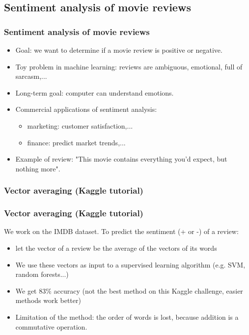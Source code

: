 \documentclass{beamer}
\begin{document}
\begin{frame}
\subsection{Sentiment analysis of movie reviews}

\frametitle{Sentiment analysis of movie reviews}

\begin{itemize}
\item Goal: we want to determine if a movie review is positive or negative. 
\item Toy problem in machine learning: reviews are ambiguous, emotional, full of sarcasm,... 
\item Long-term goal: computer can understand emotions. 
\item Commercial applications of sentiment analysis: 
\begin{itemize}
\item marketing: customer satisfaction,... 
\item finance: predict market trends,...
\end{itemize} 
 
\item Example of review: "This movie contains everything you'd expect, but nothing more". 

\end{itemize}

\end{frame}

\begin{frame}

\subsubsection{ Vector averaging (Kaggle tutorial)}

\frametitle{Vector averaging (Kaggle tutorial)}

We work on the IMDB dataset. To predict the sentiment (+ or -) of a review:

\begin{itemize}
\item let the vector of a review be the average of the vectors of its words
\item We use these vectors as input to a supervised learning algorithm (e.g. SVM, random forests...)
\item We get $83\%$ accuracy (not the best method on this Kaggle challenge, easier methods work better)

\item Limitation of the method: the order of words is lost, because addition is a commutative operation. 
\end{itemize}

\end{frame}
\end{document}
